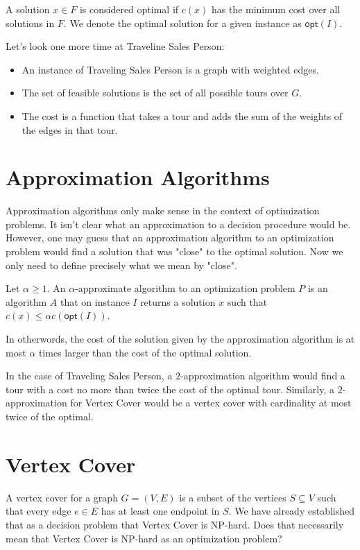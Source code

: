 A solution $x \in F$ is considered optimal if $c(x)$ has the minimum cost over all solutions in $F$.
We denote the optimal solution for a given instance as $\textsf{opt}(I)$.

Let's look one more time at Traveline Sales Person:
\begin{itemize}
\item An instance of Traveling Sales Person is a graph with weighted edges.
\item The set of feasible solutions is the set of all possible tours over $G$.
\item The cost is a function that takes a tour and adds the sum of the weights of the edges in that tour.
\end{itemize}

\section{Approximation Algorithms}

Approximation algorithms only make sense in the context of optimization problems.
It isn't clear what an approximation to a decision procedure would be.
However, one may guess that an approximation algorithm to an optimization problem would find a solution that was "close" to the optimal solution.
Now we only need to define precisely what we mean by "close".

Let $\alpha \ge 1$.
An $\alpha$-approximate algorithm to an optimization problem $P$ is an algorithm $A$ that on instance $I$ returns a solution $x$ such that $c(x) \le \alpha c(\textsf{opt}(I))$.

In otherwords, the cost of the solution given by the approximation algorithm is at most $\alpha$ times larger than the cost of the optimal solution.

In the case of Traveling Sales Person, a $2$-approximation algorithm would find a tour with a cost no more than twice the cost of the optimal tour.
Similarly, a $2$-approximation for Vertex Cover would be a vertex cover with cardinality at most twice of the optimal.

\section{Vertex Cover}

A vertex cover for a graph $G = (V, E)$ is a subset of the vertices $S \subseteq V$ such that every edge $e \in E$ has at least one endpoint in $S$.
We have already established that as a decision problem that Vertex Cover is NP-hard.
Does that necessarily mean that Vertex Cover is NP-hard as an optimization problem?

